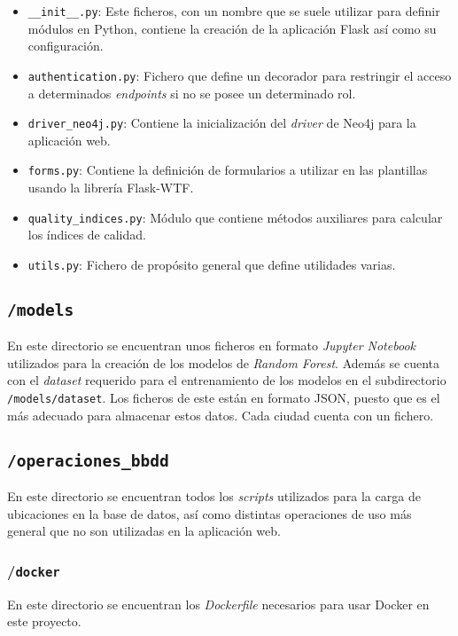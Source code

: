 \begin{itemize}
	\item \texttt{\_\_init\_\_.py}: Este ficheros, con un nombre que se suele utilizar para definir módulos en Python, contiene la creación de la aplicación Flask así como su configuración.
	\item \texttt{authentication.py}: Fichero que define un decorador para restringir el acceso a determinados \textit{endpoints} si no se posee un determinado rol.
	\item \texttt{driver\_neo4j.py}: Contiene la inicialización del \textit{driver} de Neo4j para la aplicación web.
	\item \texttt{forms.py}: Contiene la definición de formularios a utilizar en las plantillas usando la librería Flask-WTF.
	\item \texttt{quality\_indices.py}: Módulo que contiene métodos auxiliares para calcular los índices de calidad.
	\item \texttt{utils.py}: Fichero de propósito general que define utilidades varias.
\end{itemize}


\subsection{\texttt{/models}}
En este directorio se encuentran unos ficheros en formato \textit{Jupyter Notebook} utilizados para la creación de los modelos de \textit{Random Forest}. Además se cuenta con el \textit{dataset} requerido para el entrenamiento de los modelos en el subdirectorio \texttt{/models/dataset}. Los ficheros de este están en formato JSON, puesto que es el más adecuado para almacenar estos datos. Cada ciudad cuenta con un fichero.

\subsection{\texttt{/operaciones\_bbdd}}
En este directorio se encuentran todos los \textit{scripts} utilizados para la carga de ubicaciones en la base de datos, así como distintas operaciones de uso más general que no son utilizadas en la aplicación web.

\subsubsection{/\texttt{docker}}
En este directorio se encuentran los \textit{Dockerfile} necesarios para usar Docker en este proyecto.

